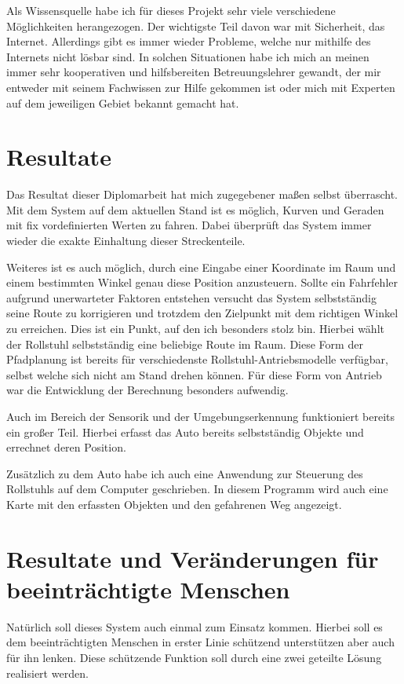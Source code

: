 Als Wissensquelle habe ich für dieses Projekt sehr viele verschiedene Möglichkeiten herangezogen.
Der wichtigste Teil davon war mit Sicherheit, das Internet.
Allerdings gibt es immer wieder Probleme, welche nur mithilfe des Internets nicht lösbar sind.
In solchen Situationen habe ich mich an meinen immer sehr kooperativen und hilfsbereiten Betreuungslehrer gewandt, der mir entweder mit seinem Fachwissen zur Hilfe gekommen ist oder mich mit Experten auf dem jeweiligen Gebiet bekannt gemacht hat.


\section{Resultate}
Das Resultat dieser Diplomarbeit hat mich zugegebener maßen selbst überrascht.
Mit dem System auf dem aktuellen Stand ist es möglich, Kurven und Geraden mit fix vordefinierten Werten zu fahren.
Dabei überprüft das System immer wieder die exakte Einhaltung dieser Streckenteile.

Weiteres ist es auch möglich, durch eine Eingabe einer Koordinate im Raum und einem bestimmten Winkel genau diese Position anzusteuern.
Sollte ein Fahrfehler aufgrund unerwarteter Faktoren entstehen versucht das System selbstständig seine Route zu korrigieren und trotzdem den Zielpunkt mit dem richtigen Winkel zu erreichen.
Dies ist ein Punkt, auf den ich besonders stolz bin.
Hierbei wählt der Rollstuhl selbstständig eine beliebige Route im Raum.
Diese Form der Pfadplanung ist bereits für verschiedenste Rollstuhl-Antriebsmodelle verfügbar, selbst welche sich nicht am Stand drehen können.
Für diese Form von Antrieb war die Entwicklung der Berechnung besonders aufwendig.

Auch im Bereich der Sensorik und der Umgebungserkennung funktioniert bereits ein großer Teil.
Hierbei erfasst das Auto bereits selbstständig Objekte und errechnet deren Position.

Zusätzlich zu dem Auto habe ich auch eine Anwendung zur Steuerung des Rollstuhls auf dem Computer geschrieben.
In diesem Programm wird auch eine Karte mit den erfassten Objekten und den gefahrenen Weg angezeigt.


\section{Resultate und Veränderungen für beeinträchtigte Menschen}
Natürlich soll dieses System auch einmal zum Einsatz kommen.
Hierbei soll es dem beeinträchtigten Menschen in erster Linie schützend unterstützen aber auch für ihn lenken.
Diese schützende Funktion soll durch eine zwei geteilte Lösung realisiert werden.


